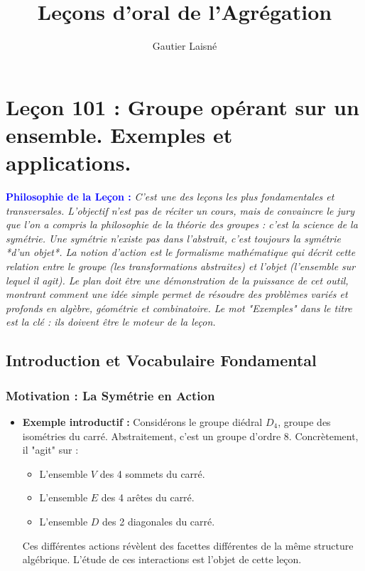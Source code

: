 \documentclass[12pt, a4paper, parskip=full]{report}
\title{Leçons d'oral de l'Agrégation}
\author{Gautier Laisné}
\date{}
\theoremstyle{agregstyle}
\newenvironment{philosophie}
  {\par\medskip\noindent\begin{oframed}\noindent\textbf{\textcolor{blue}{Philosophie de la Leçon :}}\itshape}
  {\end{oframed}\par\medskip}
\begin{document}
\maketitle

\chapter{Leçon 101 : Groupe opérant sur un ensemble. Exemples et applications.}

\begin{philosophie}
    C'est une des leçons les plus fondamentales et transversales. L'objectif n'est pas de réciter un cours, mais de convaincre le jury que l'on a compris la philosophie de la théorie des groupes : c'est la science de la symétrie. Une symétrie n'existe pas dans l'abstrait, c'est toujours la symétrie *d'un objet*. La notion d'action est le formalisme mathématique qui décrit cette relation entre le groupe (les transformations abstraites) et l'objet (l'ensemble sur lequel il agit). Le plan doit être une démonstration de la puissance de cet outil, montrant comment une idée simple permet de résoudre des problèmes variés et profonds en algèbre, géométrie et combinatoire. Le mot "Exemples" dans le titre est la clé : ils doivent être le moteur de la leçon.
\end{philosophie}

\section{Introduction et Vocabulaire Fondamental}

\subsection{Motivation : La Symétrie en Action}
\begin{itemize}
    \item \textbf{Exemple introductif :} Considérons le groupe diédral $D_4$, groupe des isométries du carré. Abstraitement, c'est un groupe d'ordre 8. Concrètement, il "agit" sur :
        \begin{itemize}
            \item L'ensemble $V$ des 4 sommets du carré.
            \item L'ensemble $E$ des 4 arêtes du carré.
            \item L'ensemble $D$ des 2 diagonales du carré.
        \end{itemize}
    Ces différentes actions révèlent des facettes différentes de la même structure algébrique. L'étude de ces interactions est l'objet de cette leçon.
\end{itemize}
\end{document}
